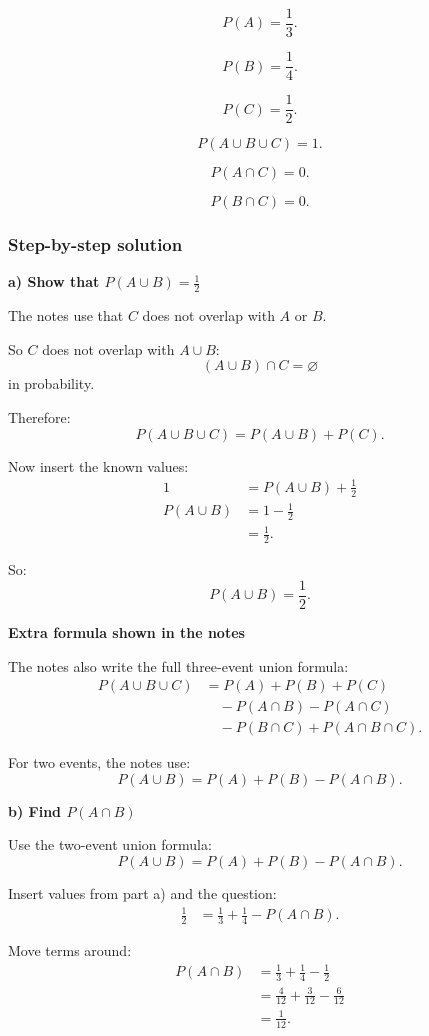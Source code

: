 \documentclass[10pt]{article}
\begin{document}
\[
P(A)=\frac{1}{3}.
\]

\[
P(B)=\frac{1}{4}.
\]

\[
P(C)=\frac{1}{2}.
\]

\[
P(A\cup B\cup C)=1.
\]

\[
P(A\cap C)=0.
\]

\[
P(B\cap C)=0.
\]

\subsubsection*{Step-by-step solution}

\textbf{a) Show that \(P(A\cup B)=\frac12\)}

The notes use that \(C\) does not overlap with
\(A\) or \(B\).

So \(C\) does not overlap with \(A\cup B\):
\[
(A\cup B)\cap C=\varnothing
\]
in probability.

Therefore:
\[
P(A\cup B\cup C)
=
P(A\cup B)+P(C).
\]

Now insert the known values:
\begin{align*}
1
&=
P(A\cup B)
+
\frac{1}{2}
\\[2mm]
P(A\cup B)
&=
1-\frac{1}{2}
\\[2mm]
&=
\frac{1}{2}.
\end{align*}

So:
\[
P(A\cup B)=\frac{1}{2}.
\]

\textbf{Extra formula shown in the notes}

The notes also write the full three-event union
formula:
\begin{align*}
P(A\cup B\cup C)
&=
P(A)+P(B)+P(C)
\\
&\quad
-P(A\cap B)
-P(A\cap C)
\\
&\quad
-P(B\cap C)
+P(A\cap B\cap C).
\end{align*}

For two events, the notes use:
\[
P(A\cup B)
=
P(A)+P(B)-P(A\cap B).
\]

\textbf{b) Find \(P(A\cap B)\)}

Use the two-event union formula:
\[
P(A\cup B)
=
P(A)+P(B)-P(A\cap B).
\]

Insert values from part a) and the question:
\begin{align*}
\frac{1}{2}
&=
\frac{1}{3}
+
\frac{1}{4}
-
P(A\cap B).
\end{align*}

Move terms around:
\begin{align*}
P(A\cap B)
&=
\frac{1}{3}
+
\frac{1}{4}
-
\frac{1}{2}
\\[2mm]
&=
\frac{4}{12}
+
\frac{3}{12}
-
\frac{6}{12}
\\[2mm]
&=
\frac{1}{12}.
\end{align*}
\end{document}
